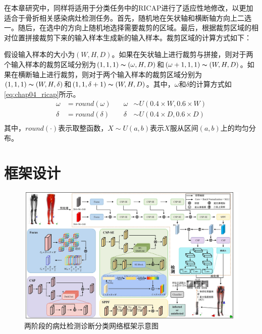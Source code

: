 在本章研究中，同样将适用于分类任务中的RICAP进行了适应性地修改，以更加适合于骨折相关感染病灶检测任务。首先，随机地在矢状轴和横断轴方向上二选一。随后，在选中的方向上随机地选择需要裁剪的区域。最后，根据裁剪区域的相对位置拼接裁剪下来的输入样本生成新的输入样本。裁剪区域的计算方式如下：

假设输入样本的大小为\((W,H,D)\)。如果在矢状轴上进行裁剪与拼接，则对于两个输入样本的裁剪区域分别为\((1, 1, 1)\thicksim (\omega, H, D)\)和\((\omega + 1, 1, 1)\thicksim (W, H, D)\)。如果在横断轴上进行裁剪，则对于两个输入样本的裁剪区域分别为\((1, 1, 1)\thicksim (W, H, \delta)\)和\((1, 1, \delta + 1)\thicksim (W, H, D)\)。其中，\(\omega\)和\(\delta\)的计算方式如\ref{eq:chap04_ricap}所示。
\begin{equation}
  \begin{aligned}
    \omega & = round(\omega) & \quad \omega & \sim U(0.4\times W, 0.6 \times W) \\
    \delta & = round(\delta) & \quad \delta & \sim U(0.4\times D, 0.6 \times D) \\
  \end{aligned}
  \label{eq:chap04_ricap}
\end{equation}
其中，\(round(\cdot)\)表示取整函数，\(X \sim U(a, b)\)表示\(X\)服从区间\((a,b)\)上的均匀分布。

\section{框架设计}

\begin{figure}
  \centering
  \includegraphics[width=0.95\textheight,height=\textwidth,angle=90,keepaspectratio]{figures/chap04_model.jpg}
  \caption{两阶段的病灶检测诊断分类网络框架示意图}
  \label{fig:chap04_model}
\end{figure}

